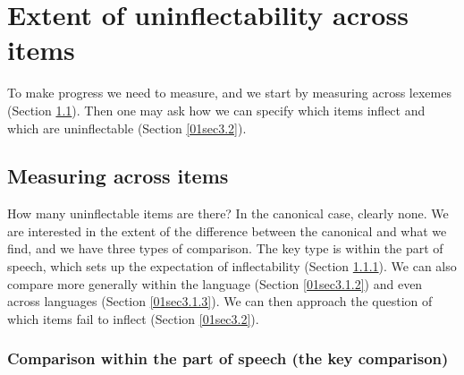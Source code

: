 \documentclass[output=paper,colorlinks,citecolor=brown]{langscibook}
\begin{document}
\section{Extent of uninflectability across items} \label{01sec3}

To make progress we need to measure, and we start by measuring across lexemes (Section \ref{01sec3.1}). Then one may ask how we can specify which items inflect and which are uninflectable (Section \ref{01sec3.2}).

\subsection{Measuring across items} \label{01sec3.1}

How many uninflectable items are there? In the canonical case, clearly none. We are interested in the extent of the difference between the canonical  and what we find, and we have three types of comparison. The key type is within the part of speech, which sets up the expectation of inflectability (Section \ref{01sec3.1.1}). We can also compare more generally within the language (Section \ref{01sec3.1.2}) and even across languages (Section \ref{01sec3.1.3}). We can then approach the question of which items fail to inflect (Section \ref{01sec3.2}).

\subsubsection{Comparison within the part of speech (the key comparison)} \label{01sec3.1.1}
\end{document}
